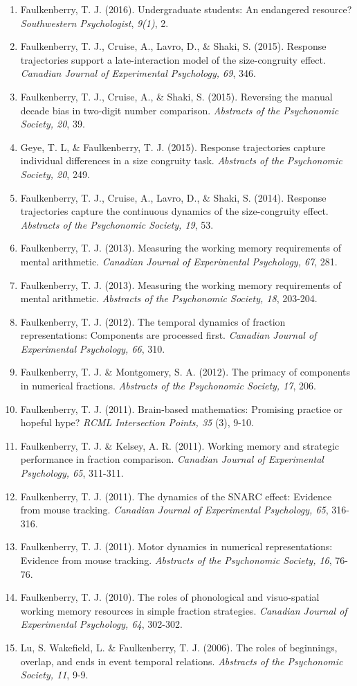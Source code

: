 \documentclass[article,10pt]{article}
\begin{document}
\begin{enumerate}
\item Faulkenberry, T. J. (2016). Undergraduate students: An endangered resource? \emph{Southwestern Psychologist}, \emph{9(1)}, 2.
\item Faulkenberry, T. J., Cruise, A., Lavro, D., \& Shaki, S. (2015). Response trajectories support a late-interaction model of the size-congruity effect. \emph{Canadian Journal of Experimental Psychology, 69}, 346.
\item Faulkenberry, T. J., Cruise, A., \& Shaki, S. (2015). Reversing the manual decade bias in two-digit number comparison. \emph{Abstracts of the Psychonomic Society, 20}, 39.
\item Geye, T. L, \& Faulkenberry, T. J. (2015). Response trajectories capture individual differences in a size congruity task. \emph{Abstracts of the Psychonomic Society, 20}, 249.
\item Faulkenberry, T. J., Cruise, A., Lavro, D., \& Shaki, S. (2014). Response trajectories capture the continuous dynamics of the size-congruity effect. \emph{Abstracts of the Psychonomic Society, 19}, 53.
\item Faulkenberry, T. J. (2013). Measuring the working memory requirements of mental arithmetic. \emph{Canadian Journal of Experimental Psychology, 67}, 281.
\item Faulkenberry, T. J. (2013). Measuring the working memory requirements of mental arithmetic. \emph{Abstracts of the Psychonomic Society, 18}, 203-204.
\item Faulkenberry, T. J. (2012). The temporal dynamics of fraction representations: Components are processed first. \emph{Canadian Journal of Experimental Psychology, 66}, 310.
\item Faulkenberry, T. J. \& Montgomery, S. A. (2012). The primacy of components in numerical fractions. \emph{Abstracts of the Psychonomic Society, 17}, 206.
\item Faulkenberry, T. J. (2011). Brain-based mathematics: Promising practice or hopeful hype? \emph{RCML Intersection Points, 35} (3), 9-10.
\item Faulkenberry, T. J. \& Kelsey, A. R. (2011). Working memory and strategic performance in fraction comparison. \emph{Canadian Journal of Experimental Psychology, 65}, 311-311.
\item Faulkenberry, T. J. (2011). The dynamics of the SNARC effect: Evidence from mouse tracking. \emph{Canadian Journal of Experimental Psychology, 65}, 316-316.
\item Faulkenberry, T. J. (2011). Motor dynamics in numerical representations: Evidence from mouse tracking. \emph{Abstracts of the Psychonomic Society, 16}, 76-76.
\item Faulkenberry, T. J. (2010). The roles of phonological and visuo-spatial working memory resources in simple fraction strategies. \emph{Canadian Journal of Experimental Psychology, 64}, 302-302.
\item Lu, S. Wakefield, L. \& Faulkenberry, T. J. (2006). The roles of beginnings, overlap, and ends in event temporal relations. \emph{Abstracts of the Psychonomic Society, 11}, 9-9.
\end{enumerate}
\end{document}
